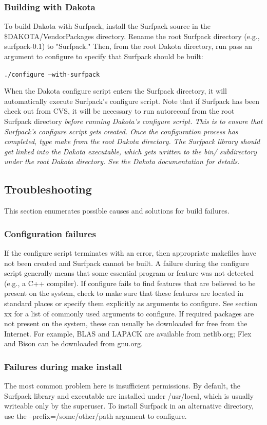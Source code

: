 \documentclass{article}
\begin{document}
\subsubsection{Building with Dakota}
To build Dakota with Surfpack, install the Surfpack source in the \$DAKOTA/VendorPackages directory.  Rename the root Surfpack directory (e.g., surfpack-0.1) to "Surfpack."  Then, from the root Dakota directory, run pass an argument to configure to specify that Surfpack should be built:

\texttt{./configure --with-surfpack}

When the Dakota configure script enters the Surfpack directory, it will automatically execute Surfpack's configure script.  Note that if Surfpack has been check out from CVS, it will be necessary to run autoreconf from the root Surfpack directory \em{before} running Dakota's configure script.  This is to ensure that Surfpack's configure script gets created.  Once the configuration process has completed, type make from the root Dakota directory.  The Surfpack library should get linked into the Dakota executable, which gets written to the bin/ subdirectory under the root Dakota directory.  See the Dakota documentation for details.

\subsection{Troubleshooting}
This section enumerates possible causes and solutions for build failures.
\subsubsection{Configuration failures}
If the configure script terminates with an error, then appropriate makefiles have not been created and Surfpack cannot be built.  A failure during the configure script generally means that some essential program or feature was not detected (e.g., a C++ compiler). If configure fails to find features that are believed to be present on the system, check to make sure that these features are located in standard places or specify them explicitly as arguments to configure.  See section xx for a list of commonly used arguments to configure.  If required packages are not present on the system, these can usually be downloaded for free from the Internet.  For example, BLAS and LAPACK are available from netlib.org; Flex and Bison can be downloaded from gnu.org.
\subsubsection{Failures during make install}
The most common problem here is insufficient permissions.  By default, the Surfpack library and executable are installed under /usr/local, which is usually writeable only by the superuser.  To install Surfpack in an alternative directory, use the --prefix=/some/other/path argument to configure.
\end{document}
